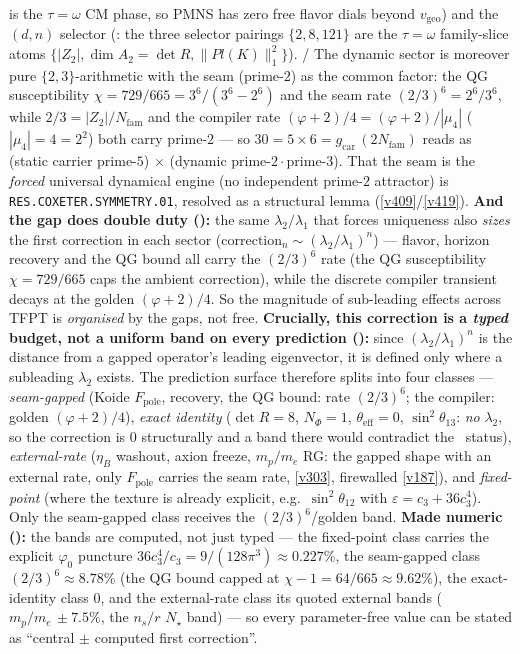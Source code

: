 \documentclass[11pt,a4paper]{article}
\newcommand{\gcar}{g_{\mathrm{car}}}
\newcommand{\Nfam}{N_{\mathrm{fam}}}
\begin{document}
is the $\tau{=}\omega$ CM phase, so PMNS has zero free flavor dials beyond $v_{\mathrm{geo}}$) and the $(d,n)$
selector (: the three selector pairings $\{2,8,121\}$ are the $\tau{=}\omega$
family-slice atoms $\{|Z_2|,\dim A_2{=}\det R,\|Pl(K)\|_1^2\}$). \mE/\mC
The dynamic sector is moreover pure $\{2,3\}$-arithmetic with the seam (prime-$2$) as the common factor: the QG
susceptibility $\chi=729/665=3^6/(3^6{-}2^6)$ and the seam rate $(2/3)^6=2^6/3^6$, while $2/3=|Z_2|/\Nfam$ and the
compiler rate $(\varphi{+}2)/4=(\varphi{+}2)/|\mu_4|$ ($|\mu_4|{=}4{=}2^2$) both carry prime-$2$ --- so $30=5\times6
=\gcar\,(2\Nfam)$ reads as (static carrier prime-$5$) $\times$ (dynamic prime-$2{\cdot}$prime-$3$). That the
seam is the \emph{forced} universal dynamical engine (no independent prime-$2$ attractor) is
\texttt{RES.COXETER.SYMMETRY.01}, resolved as a structural lemma (\vref{v409}/\vref{v419}). \textbf{And the gap does double duty ():} the same
$\lambda_2/\lambda_1$ that forces uniqueness also \emph{sizes} the first correction in each sector
($\mathrm{correction}_n\sim(\lambda_2/\lambda_1)^n$) --- flavor, horizon recovery and the QG bound all carry the
$(2/3)^6$ rate (the QG susceptibility $\chi=729/665$ caps the ambient correction), while the discrete compiler
transient decays at the golden $(\varphi+2)/4$. So the magnitude of sub-leading effects across TFPT is
\emph{organised} by the gaps, not free. \textbf{Crucially, this correction is a \emph{typed} budget, not a
uniform band on every prediction ():} since $(\lambda_2/\lambda_1)^n$ is the
distance from a gapped operator's leading eigenvector, it is defined only where a subleading $\lambda_2$ exists.
The prediction surface therefore splits into four classes --- \emph{seam-gapped} (Koide $F_{\mathrm{pole}}$,
recovery, the QG bound: rate $(2/3)^6$; the compiler: golden $(\varphi+2)/4$), \emph{exact identity}
($\det R=8$, $N_\Phi=1$, $\theta_{\mathrm{eff}}=0$, $\sin^2\theta_{13}$: \emph{no} $\lambda_2$, so the correction is
$0$ structurally and a band there would contradict the \mE\ status), \emph{external-rate} ($\eta_B$ washout,
axion freeze, $m_p/m_e$ RG: the gapped shape with an external rate, only $F_{\mathrm{pole}}$ carries the seam rate,
\vref{v303}, firewalled \vref{v187}), and \emph{fixed-point} (where the texture is already explicit, e.g.\
$\sin^2\theta_{12}$ with $\varepsilon=c_3+36c_3^4$). Only the seam-gapped class receives the $(2/3)^6$/golden band.
\textbf{Made numeric (\veri{v393\_corrections\_numeric.py}):} the bands are computed, not just typed --- the
fixed-point class carries the explicit $\varphi_0$ puncture $36c_3^4/c_3=9/(128\pi^3)\approx0.227\%$, the seam-gapped
class $(2/3)^6\approx8.78\%$ (the QG bound capped at $\chi-1=64/665\approx9.62\%$), the exact-identity class $0$, and the
external-rate class its quoted external bands ($m_p/m_e\,{\pm}7.5\%$, the $n_s/r$ $N_\star$ band) --- so every
parameter-free value can be stated as ``central $\pm$ computed first correction''.
\end{document}
